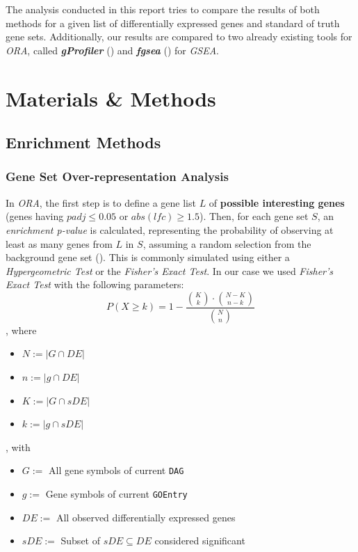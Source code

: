 \documentclass[12pt]{article}
\begin{document}
The analysis conducted in this report tries to compare the results of both methods
for a given list of differentially expressed genes and standard of truth gene sets.
Additionally, our results are compared to two already existing tools for \textit{ORA}, called
\textit{\textbf{gProfiler}} (\cite{gprofiler}) and \textit{\textbf{fgsea}} (\cite{fgsea})
for \textit{GSEA}.

\section{Materials \& Methods}
\subsection{Enrichment Methods}\label{sec:Enrichment-Methods}
\subsubsection{Gene Set Over-representation Analysis}\label{sec:Gene-Set-Over-representation-Analysis}
In \textit{ORA}, the first step is to define a gene list $L$ of \textbf{possible interesting genes} (genes having $padj \le 0.05$ or $abs(lfc) \ge 1.5$).
Then, for each gene set $S$, an \textit{enrichment p-value} is calculated, representing the 
probability of observing at least as many genes from $L$ in $S$, assuming a random selection from the background gene set (\cite{ORA}).
This is commonly simulated using either a \textit{Hypergeometric Test} or the \textit{Fisher's Exact Test}.
In our case we used \textit{Fisher's Exact Test} with the following parameters:
\[
    P(X \ge k) = 1 - \frac{\binom{K}{k} \cdot \binom{N-K}{n-k}}{\binom{N}{n}} 
\]
, where 
\begin{itemize}
    \item $N := |G \cap DE|$ 
    \item $n := |g \cap DE|$ 
    \item $K := |G \cap sDE|$ 
    \item $k := |g \cap sDE|$ 
\end{itemize}
, with 
\begin{itemize}
    \item $G := $ All gene symbols of current \texttt{DAG}
    \item $g := $ Gene symbols of current \texttt{GOEntry}
    \item $DE := $ All observed differentially expressed genes 
    \item $sDE :=$ Subset of $sDE \subseteq DE$ considered significant
\end{itemize}
\end{document}
